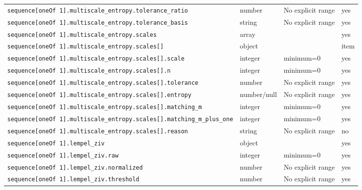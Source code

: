 \begin{longtable}{@{}p{}p{}p{}p{}@{}}
\texttt{sequence[oneOf 1].\allowbreak{}multiscale\_\allowbreak{}entropy.\allowbreak{}tolerance\_\allowbreak{}ratio} & number & No explicit range & yes\\
\texttt{sequence[oneOf 1].\allowbreak{}multiscale\_\allowbreak{}entropy.\allowbreak{}tolerance\_\allowbreak{}basis} & string & No explicit range & yes\\
\texttt{sequence[oneOf 1].\allowbreak{}multiscale\_\allowbreak{}entropy.\allowbreak{}scales} & array &  & yes\\
\texttt{sequence[oneOf 1].\allowbreak{}multiscale\_\allowbreak{}entropy.\allowbreak{}scales[]} & object &  & item\\
\texttt{sequence[oneOf 1].\allowbreak{}multiscale\_\allowbreak{}entropy.\allowbreak{}scales[].\allowbreak{}scale} & integer & minimum=0 & yes\\
\texttt{sequence[oneOf 1].\allowbreak{}multiscale\_\allowbreak{}entropy.\allowbreak{}scales[].\allowbreak{}n} & integer & minimum=0 & yes\\
\texttt{sequence[oneOf 1].\allowbreak{}multiscale\_\allowbreak{}entropy.\allowbreak{}scales[].\allowbreak{}tolerance} & number & No explicit range & yes\\
\texttt{sequence[oneOf 1].\allowbreak{}multiscale\_\allowbreak{}entropy.\allowbreak{}scales[].\allowbreak{}entropy} & number/null & No explicit range & yes\\
\texttt{sequence[oneOf 1].\allowbreak{}multiscale\_\allowbreak{}entropy.\allowbreak{}scales[].\allowbreak{}matching\_\allowbreak{}m} & integer & minimum=0 & yes\\
\texttt{sequence[oneOf 1].\allowbreak{}multiscale\_\allowbreak{}entropy.\allowbreak{}scales[].\allowbreak{}matching\_\allowbreak{}m\_\allowbreak{}plus\_\allowbreak{}one} & integer & minimum=0 & yes\\
\texttt{sequence[oneOf 1].\allowbreak{}multiscale\_\allowbreak{}entropy.\allowbreak{}scales[].\allowbreak{}reason} & string & No explicit range & no\\
\texttt{sequence[oneOf 1].\allowbreak{}lempel\_\allowbreak{}ziv} & object &  & yes\\
\texttt{sequence[oneOf 1].\allowbreak{}lempel\_\allowbreak{}ziv.\allowbreak{}raw} & integer & minimum=0 & yes\\
\texttt{sequence[oneOf 1].\allowbreak{}lempel\_\allowbreak{}ziv.\allowbreak{}normalized} & number & No explicit range & yes\\
\texttt{sequence[oneOf 1].\allowbreak{}lempel\_\allowbreak{}ziv.\allowbreak{}threshold} & number & No explicit range & yes\\

\end{longtable}
